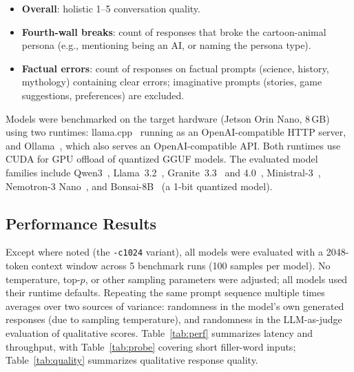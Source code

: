 \documentclass[11pt]{article}
\begin{document}
\begin{itemize}[nosep]
  \item \textbf{Overall}: holistic 1--5 conversation quality.
  \item \textbf{Fourth-wall breaks}: count of responses that broke the cartoon-animal persona
    (e.g., mentioning being an AI, or naming the persona type).
  \item \textbf{Factual errors}: count of responses on factual prompts (science, history, mythology) containing clear errors;
    imaginative prompts (stories, game suggestions, preferences) are excluded.
\end{itemize}

\noindent Models were benchmarked on the target hardware (Jetson Orin Nano, 8\,GB) using two runtimes:
llama.cpp~\cite{llamacpp} running as an OpenAI-compatible HTTP server, and
Ollama~\cite{ollama}, which also serves an OpenAI-compatible API.
Both runtimes use CUDA for GPU offload of quantized GGUF models.
The evaluated model families include
Qwen3~\cite{yang2025qwen3},
Llama~3.2~\cite{grattafiori2024llama},
Granite~3.3~\cite{granite2024} and 4.0~\cite{granite2025},
Ministral-3~\cite{liu2026ministral},
Nemotron-3 Nano~\cite{nemotron3nano},
and Bonsai-8B~\cite{bonsai8b} (a 1-bit quantized model).

\subsection{Performance Results}

Except where noted (the \texttt{-c1024} variant), all models were evaluated with a 2048-token context window across 5 benchmark runs (100 samples per model).
No temperature, top-$p$, or other sampling parameters were adjusted; all models used their runtime defaults.
Repeating the same prompt sequence multiple times averages over two sources of variance:
randomness in the model's own generated responses (due to sampling temperature),
and randomness in the LLM-as-judge evaluation of qualitative scores.
Table~\ref{tab:perf} summarizes latency and throughput,
with Table~\ref{tab:probe} covering short filler-word inputs;
Table~\ref{tab:quality} summarizes qualitative response quality.

\begin{table}[H]
\centering
\small

\caption{Performance benchmarks on Jetson Orin Nano (8\,GB, headless).
Steady-state and post-trim TTFT over 5 runs $\times$ 20 conversational prompts = 100 samples per engine.
Unless otherwise noted, models use Q4\_K\_M quantization and a 2048-token context.
All models achieved 100\% GPU offload;
the kernel page cache from prior model loads (via \texttt{mmap}) was cleared between engines with \texttt{drop\_caches} to ensure full offload on Jetson unified memory.}
\label{tab:perf}
\end{table}
\end{document}
